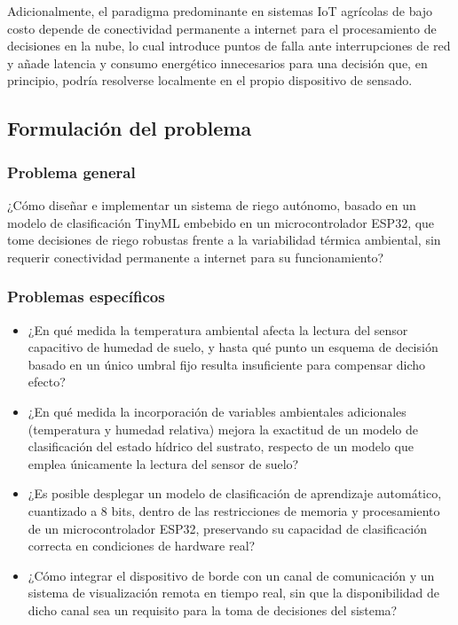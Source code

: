 \documentclass[12pt,a4paper]{article}
\begin{document}
Adicionalmente, el paradigma predominante en sistemas IoT agrícolas de bajo costo depende de conectividad permanente a internet para el procesamiento de decisiones en la nube, lo cual introduce puntos de falla ante interrupciones de red y añade latencia y consumo energético innecesarios para una decisión que, en principio, podría resolverse localmente en el propio dispositivo de sensado.

\subsection{Formulación del problema}

\subsubsection{Problema general}
¿Cómo diseñar e implementar un sistema de riego autónomo, basado en un modelo de clasificación TinyML embebido en un microcontrolador ESP32, que tome decisiones de riego robustas frente a la variabilidad térmica ambiental, sin requerir conectividad permanente a internet para su funcionamiento?

\subsubsection{Problemas específicos}
\begin{itemize}
    \item[$PE_1$:] ¿En qué medida la temperatura ambiental afecta la lectura del sensor capacitivo de humedad de suelo, y hasta qué punto un esquema de decisión basado en un único umbral fijo resulta insuficiente para compensar dicho efecto?
    \item[$PE_2$:] ¿En qué medida la incorporación de variables ambientales adicionales (temperatura y humedad relativa) mejora la exactitud de un modelo de clasificación del estado hídrico del sustrato, respecto de un modelo que emplea únicamente la lectura del sensor de suelo?
    \item[$PE_3$:] ¿Es posible desplegar un modelo de clasificación de aprendizaje automático, cuantizado a 8 bits, dentro de las restricciones de memoria y procesamiento de un microcontrolador ESP32, preservando su capacidad de clasificación correcta en condiciones de hardware real?
    \item[$PE_4$:] ¿Cómo integrar el dispositivo de borde con un canal de comunicación y un sistema de visualización remota en tiempo real, sin que la disponibilidad de dicho canal sea un requisito para la toma de decisiones del sistema?
\end{itemize}
\end{document}
